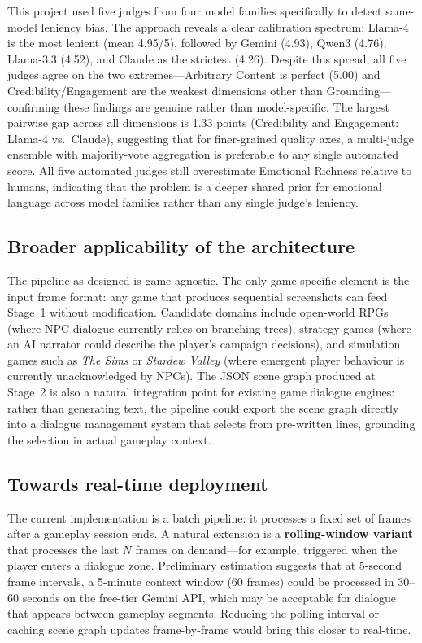 \documentclass{article}
\begin{document}
This project used five judges from four model families specifically to detect same-model leniency bias. The approach reveals a clear calibration spectrum: Llama-4 is the most lenient (mean 4.95/5), followed by Gemini (4.93), Qwen3 (4.76), Llama-3.3 (4.52), and Claude as the strictest (4.26). Despite this spread, all five judges agree on the two extremes---Arbitrary Content is perfect (5.00) and Credibility/Engagement are the weakest dimensions other than Grounding---confirming these findings are genuine rather than model-specific. The largest pairwise gap across all dimensions is 1.33 points (Credibility and Engagement: Llama-4 vs.\ Claude), suggesting that for finer-grained quality axes, a multi-judge ensemble with majority-vote aggregation is preferable to any single automated score. All five automated judges still overestimate Emotional Richness relative to humans, indicating that the problem is a deeper shared prior for emotional language across model families rather than any single judge's leniency.

\subsection{Broader applicability of the architecture}

The pipeline as designed is game-agnostic. The only game-specific element is the input frame format: any game that produces sequential screenshots can feed Stage~1 without modification. Candidate domains include open-world RPGs (where NPC dialogue currently relies on branching trees), strategy games (where an AI narrator could describe the player's campaign decisions), and simulation games such as \emph{The Sims} or \emph{Stardew Valley} (where emergent player behaviour is currently unacknowledged by NPCs). The JSON scene graph produced at Stage~2 is also a natural integration point for existing game dialogue engines: rather than generating text, the pipeline could export the scene graph directly into a dialogue management system that selects from pre-written lines, grounding the selection in actual gameplay context.

\subsection{Towards real-time deployment}

The current implementation is a batch pipeline: it processes a fixed set of frames after a gameplay session ends. A natural extension is a \textbf{rolling-window variant} that processes the last $N$ frames on demand---for example, triggered when the player enters a dialogue zone. Preliminary estimation suggests that at 5-second frame intervals, a 5-minute context window (60 frames) could be processed in 30--60 seconds on the free-tier Gemini API, which may be acceptable for dialogue that appears between gameplay segments. Reducing the polling interval or caching scene graph updates frame-by-frame would bring this closer to real-time.
\end{document}
